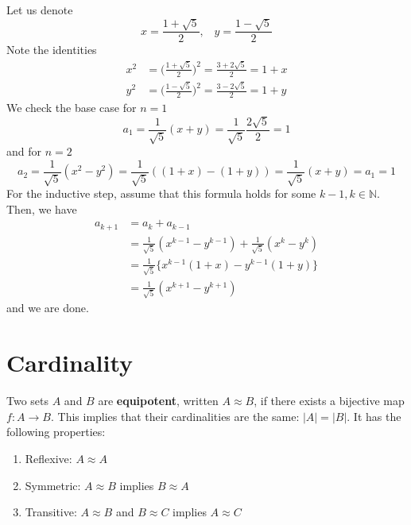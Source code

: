 \documentclass{article}
\begin{document}
    \begin{exercise}
      Let us denote 
      \begin{equation}
        x = \frac{1 + \sqrt{5}}{2} , \;\;\; y = \frac{1 - \sqrt{5}}{2}
      \end{equation} 
      Note the identities 
      \begin{align}
        x^2 & = \bigg( \frac{1 + \sqrt{5}}{2} \bigg)^2 = \frac{3 + 2 \sqrt{5}}{2} = 1 + x \\
        y^2 & = \bigg( \frac{1 - \sqrt{5}}{2} \bigg)^2 = \frac{3 - 2 \sqrt{5}}{2} = 1 + y
      \end{align}
      We check the base case for $n = 1$
      \begin{equation}
        a_1 = \frac{1}{\sqrt{5}} (x + y) = \frac{1}{\sqrt{5}} \frac{2 \sqrt{5}}{2} = 1
      \end{equation} 
      and for $n = 2$ 
      \begin{equation}
        a_2 = \frac{1}{\sqrt{5}} (x^2 - y^2) = \frac{1}{\sqrt{5}} ((1+x) - (1+y)) = \frac{1}{\sqrt{5}} (x + y) = a_1 = 1
      \end{equation}
      For the inductive step, assume that this formula holds for some $k-1, k \in \mathbb{N}$. Then, we have 
      \begin{align}
        a_{k+1} & = a_{k} + a_{k-1} \\
                & = \frac{1}{\sqrt{5}} (x^{k-1} - y^{k-1}) + \frac{1}{\sqrt{5}} (x^k - y^k) \\
                & = \frac{1}{\sqrt{5}} \big\{ x^{k-1} (1 + x) - y^{k-1} (1 + y)\big\} \\
                & = \frac{1}{\sqrt{5}} (x^{k+1} - y^{k+1})
      \end{align}
      and we are done. 
    \end{exercise}

\section{Cardinality}

  \begin{definition}[Equipotence]
    Two sets $A$ and $B$ are \textbf{equipotent}, written $A \approx B$, if there exists a bijective map $f: A \rightarrow B$. This implies that their cardinalities are the same: $|A| = |B|$. It has the following properties: 
    \begin{enumerate}
      \item Reflexive: $A \approx A$
      \item Symmetric: $A \approx B$ implies $B \approx A$
      \item Transitive: $A \approx B$ and $B \approx C$ implies $A \approx C$
    \end{enumerate}
  \end{definition}
\end{document}

